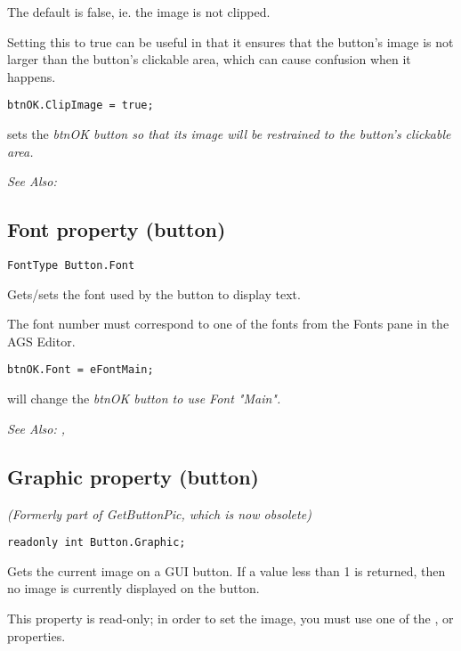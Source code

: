 The default is false, ie. the image is not clipped.

Setting this to true can be useful in that it ensures that the button's image is not larger
than the button's clickable area, which can cause confusion when it happens.

\begin{verbatim}
btnOK.ClipImage = true;
\end{verbatim}
sets the \it{btnOK} button so that its image will be restrained to the button's clickable area.

\it{See Also:} 


\subsection{Font property (button)}\label{Button.Font}%

\begin{verbatim}
FontType Button.Font
\end{verbatim}
Gets/sets the font used by the button to display text.

The font number must correspond to one of the fonts from the Fonts pane in the AGS Editor.

\begin{verbatim}
btnOK.Font = eFontMain;
\end{verbatim}
will change the \it{btnOK} button to use Font "Main".

\it{See Also:} , 


\subsection{Graphic property (button)}\label{Button.Graphic}%

\it{(Formerly part of GetButtonPic, which is now obsolete)}

\begin{verbatim}
readonly int Button.Graphic;
\end{verbatim}
Gets the current image on a GUI button. If a value less than 1 is returned,
then no image is currently displayed on the button.

This property is read-only; in order to set the image, you must use one of the
,
 or
 properties.

